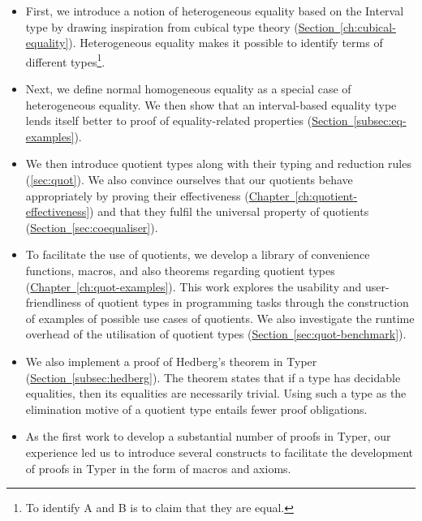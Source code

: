 \documentclass[12pt,twoside,maitrise]{dms}
\theoremstyle{definition}
\numberwithin{equation}{section}
\numberwithin{table}{chapter}
\numberwithin{figure}{chapter}
\begin{document}
\begin{itemize}
  \item{First, we introduce a notion of heterogeneous equality based on the
    Interval type by drawing inspiration from cubical type theory
    (\hyperref[ch:cubical-equality]{Section~\ref*{ch:cubical-equality}}).
    Heterogeneous equality makes it possible to identify terms of different
    types\footnote{To identify A and B is to claim that they are equal.}. }

  \item{Next, we define normal homogeneous equality as a special case of
    heterogeneous equality. We then show that an interval-based equality
    type lends itself better to proof of equality-related properties
    (\hyperref[subsec:eq-examples]{Section~\ref*{subsec:eq-examples}}).}

  \item{We then introduce quotient types along with their typing and reduction
    rules (\autoref{sec:quot}). We also convince ourselves that our quotients
    behave appropriately by proving their effectiveness
    (\hyperref[ch:quotient-effectiveness]{Chapter~\ref*{ch:quotient-effectiveness}})
    and that they fulfil the universal property of quotients
    (\hyperref[sec:coequaliser]{Section~\ref*{sec:coequaliser}}). }

  \item{To facilitate the use of quotients, we develop a library of
    convenience functions, macros, and also theorems regarding quotient types
    (\hyperref[ch:quot-examples]{Chapter~\ref*{ch:quot-examples}}). This work
    explores the usability and user-friendliness of quotient types in
    programming tasks through the construction of examples of possible use cases
    of quotients. We also investigate the runtime overhead of the utilisation of
    quotient types
    (\hyperref[sec:quot-benchmark]{Section~\ref*{sec:quot-benchmark}}).}

  \item{We also implement a proof of Hedberg's
    theorem\cite{hedberg1998coherence} in Typer
    (\hyperref[subsec:hedberg]{Section~\ref*{subsec:hedberg}}). The theorem
    states that if a type has decidable equalities, then its equalities are
    necessarily trivial. Using such a type as the elimination motive of a
    quotient type entails fewer proof obligations. }

  \item{As the first work to develop a substantial number of proofs in Typer,
    our experience led us to introduce several constructs to facilitate the
    development of proofs in Typer in the form of macros and axioms. }
\end{itemize}
\end{document}
